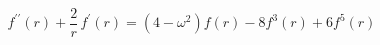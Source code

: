 \begin{equation}
f^{\prime \prime }(r)+\frac{2}{r}\,f^{\prime }(r)=\left( 4-\omega
^{2}\right) f(r)-8f^{3}(r)+6f^{5}(r)  \label{prof}
\end{equation}%
